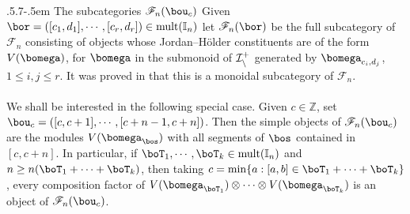 \documentclass[11pt,reqno]{amsart}
\makeatletter
\theoremstyle{definition} \newtheorem*{defn}{Definition}
\theoremstyle{definition}
\numberwithin{equation}{section}
\def\subsection{\def\@secnumfont{\bfseries}\@startsection{subsection}{2}%
  {\parindent}{.5\linespacing\@plus.7\linespacing}{-.5em}%
  {\normalfont\bfseries}}
\makeatother
\begin{document}
\subsection{The subcategories $\mathscr F_n(\bou_c)$}\label{bou} Given
$\bor=([c_1,d_1],\cdots,[c_r,d_r])\in{\rm mult}(\mathbb I_n)$ let $\mathscr F_n(\bor)$ be
the full subcategory of $\mathscr F_n$ consisting of objects whose Jordan--H\"older constituents are of
the form $V(\bomega)$, for $\bomega$ in the submonoid of $\cal I_n^+$ generated by $\bomega_{c_i,d_j}$,
$1\leq i,j\leq r$. It was proved in \cite[Proposition 5.1]{BC25b} that this is a monoidal subcategory of $\mathscr F_n$.
\\\\
We shall be interested in the following special case. Given $c\in\mathbb Z$, set
$\bou_c=([c,c+1],\cdots,[c+n-1,c+n])$. Then the simple objects of $\mathscr F_n(\bou_c)$ are the modules
$V(\bomega_\bos)$ with all segments of $\bos$ contained in $[c,c+n]$. In particular, if
$\boT_1,\cdots,\boT_k\in{\rm mult}(\mathbb I_n)$ and $n\ge n(\boT_1+\cdots+\boT_k)$, then taking
$c=\min\{a:[a,b]\in\boT_1+\cdots+\boT_k\}$, every composition factor of
$V(\bomega_{\boT_1})\otimes\cdots\otimes V(\bomega_{\boT_k})$ is an object of $\mathscr F_n(\bou_c)$.
\end{document}
